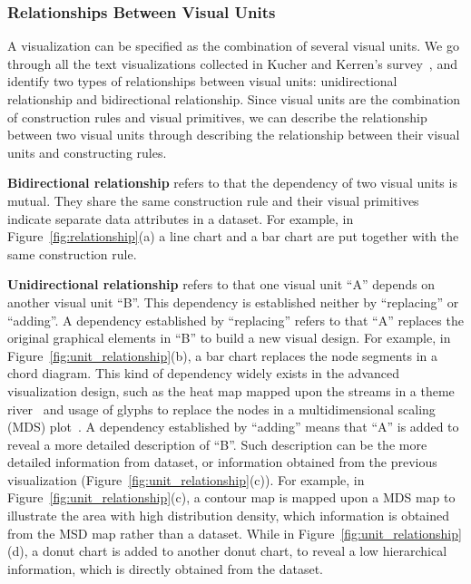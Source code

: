 \subsubsection{Relationships Between Visual Units}
A visualization can be specified as the combination of several visual units. 
We go through all the text visualizations collected in Kucher and Kerren's survey~\cite{kucher2015text}, and identify two types of relationships between visual units: unidirectional relationship and bidirectional relationship. Since visual units are the combination of construction rules and visual primitives, we can describe the relationship between two visual units through describing the relationship between their visual units and constructing rules.  

\noindent
\textbf{Bidirectional relationship} refers to that the dependency of two visual units is mutual. They share the same construction rule and their visual primitives indicate separate data attributes in a dataset.
For example, in Figure~\ref{fig:relationship}(a) a line chart and  a bar chart are put together with the same construction rule. 

\noindent
\textbf{Unidirectional relationship} refers to that one visual unit ``A'' depends on another visual unit ``B''.  This dependency is established neither by ``replacing'' or ``adding''. A dependency established by ``replacing'' refers to that ``A'' replaces the original graphical elements in ``B'' to build a new visual design. For example, in Figure~\ref{fig:unit_relationship}(b), a bar chart replaces the node segments in a chord diagram. This kind of dependency widely exists in the advanced visualization design, such as the heat map mapped upon the streams in a theme river~\cite{wu_opinionflow:_2014}  and usage of glyphs to replace the nodes in a multidimensional scaling (MDS) plot~\cite{chen_peakvizor:_2016}. A dependency established by ``adding'' means that ``A'' is added to reveal a more detailed description of ``B''. Such description can be the more detailed information from dataset, or information obtained from the previous visualization (Figure~\ref{fig:unit_relationship}(c)). For example, in Figure~\ref{fig:unit_relationship}(c), a contour map is mapped upon a MDS map to illustrate the area with high distribution density, which information is obtained from the MSD map rather than a dataset. While in Figure~\ref{fig:unit_relationship}(d), a donut chart is added to another donut chart, to reveal a low hierarchical information, which is directly obtained from the dataset. 


